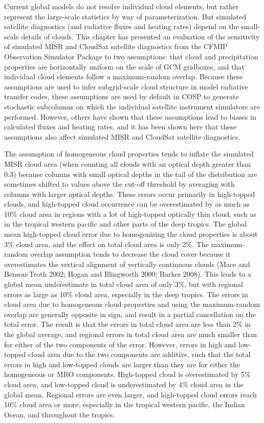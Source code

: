 Current global models do not resolve individual cloud elements, but
rather represent the large-scale statistics by way of parameterization.
But simulated satellite diagnostics (and radiative fluxes and heating
rates) depend on the small-scale details of clouds. This chapter has
presented an evaluation of the sensitivity of simulated MISR and
CloudSat satellite diagnostics from the CFMIP Observation Simulator
Package to two assumptions: that cloud and precipitation properties are
horizontally uniform on the scale of GCM gridboxes, and that individual
cloud elements follow a maximum-random overlap. Because these
assumptions are used to infer subgrid-scale cloud structure in model
radiative transfer codes, these assumptions are used by default in COSP
to generate stochastic subcolumns on which the individual satellite
instrument simulators are performed. However, others have shown that
these assumptions lead to biases in calculated fluxes and heating rates,
and it has been shown here that these assumptions also affect simulated
MISR and CloudSat satellite diagnostics.

The assumption of homogeneous cloud properties tends to inflate the
simulated MISR cloud area (when counting all clouds with an optical
depth greater than 0.3) because columns with small optical depths in the
tail of the distribution are sometimes shifted to values above the
cut-off threshold by averaging with columns with larger optical depths.
These errors occur primarily in high-topped clouds, and high-topped
cloud occurrence can be overestimated by as much as 10\% cloud area in
regions with a lot of high-topped optically thin cloud, such as in the
tropical western pacific and other parts of the deep tropics. The global
mean high-topped cloud error due to homogenizing the cloud properties is
about 3\% cloud area, and the effect on total cloud area is only 2\%.
The maximum-random overlap assumption tends to decrease the cloud cover
because it overestimates the vertical alignment of vertically continuous
clouds (Mace and Benson-Troth 2002; Hogan and Illingworth 2000; Barker
2008). This leads to a global mean underestimate in total cloud area of
only 3\%, but with regional errors as large as 10\% cloud area,
especially in the deep tropics. The errors in cloud area due to
homogeneous cloud properties and using the maximum-random overlap are
generally opposite in sign, and result in a partial cancellation on the
total error. The result is that the errors in total cloud area are less
than 2\% in the global average, and regional errors in total cloud area
are much smaller than for either of the two components of the error.
However, errors in high and low-topped cloud area due to the two
components are additive, such that the total errors in high and
low-topped clouds are larger than they are for either the homogeneous or
MRO components. High-topped cloud is overestimated by 5\% cloud area,
and low-topped cloud is underestimated by 4\% cloud area in the global
mean. Regional errors are even larger, and high-topped cloud errors
reach 10\% cloud area or more, especially in the tropical western
pacific, the Indian Ocean, and throughout the tropics.

